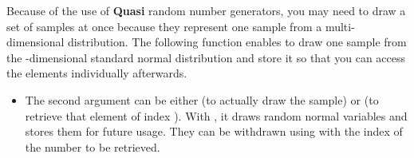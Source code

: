 Because of the use of {\bf Quasi} random number generators, you may need to
draw a set of samples at once because they represent one sample from a
multi-dimensional distribution. The following function enables to draw one
sample from the -dimensional standard normal distribution and
store it so that you can access the elements individually afterwards.
\begin{itemize}
\item {}
  \sshortdescribe The second argument can be either  (to actually
  draw the sample) or  (to retrieve that element of index
  ). With , it draws  random normal variables
  and stores them for future usage. They can be withdrawn using 
  with the index of the number to be retrieved.
\end{itemize}


